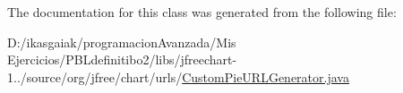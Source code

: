 The documentation for this class was generated from the following file\+:\begin{DoxyCompactItemize}
\item 
D\+:/ikasgaiak/programacion\+Avanzada/\+Mis Ejercicios/\+P\+B\+Ldefinitibo2/libs/jfreechart-\/1../source/org/jfree/chart/urls/\mbox{\hyperlink{_custom_pie_u_r_l_generator_8java}{Custom\+Pie\+U\+R\+L\+Generator.\+java}}\end{DoxyCompactItemize}
